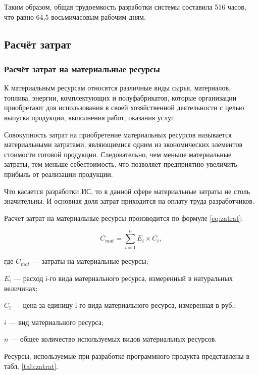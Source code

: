 Таким образом, общая трудоемкость разработки системы составила 516 часов, что равно 64,5 восьмичасовым рабочим дням.

\subsection{Расчёт затрат}

\subsubsection{Расчёт затрат на материальные ресурсы}

К материальным ресурсам относятся различные виды сырья, материалов, топлива, энергии, комплектующих и полуфабрикатов, которые организации приобретают для использования в своей хозяйственной деятельности с целью выпуска продукции, выполнения работ, оказания услуг.

Совокупность затрат на приобретение материальных ресурсов называется материальными затратами, являющимися одним из экономических элементов стоимости готовой продукции.
Следовательно, чем меньше материальные затраты, тем меньше себестоимость, что позволяет предприятию увеличить прибыль от реализации продукции.

Что касается разработки ИС, то в данной сфере материальные затраты не столь значительны.
И основная доля затрат приходится на оплату труда разработчиков.

Расчет затрат на материальные ресурсы производится по формуле \ref{eq:zatrat}:

\begin{equation}
	\label{eq:zatrat}
	C_{mat} = \sum^{n}_{i=1} E_{i} \times C_{i},
\end{equation}
\begin{ESKDexplanation}
	\item где $C_{mat}$ --- затраты на материальные ресурсы;
	\item $E_{i}$ --- расход i-го вида материального ресурса, измеренный в натуральных величинах;
	\item $C_{i}$ ---  цена за единицу i-го вида материального ресурса, измеренная в руб.;
	\item $i$ --- вид материального ресурса;
	\item $n$ --- общее количество используемых видов материальных ресурсов.
\end{ESKDexplanation}

Ресурсы, используемые при разработке программного продукта представлены в табл. \ref{tab:zatrat}. 

